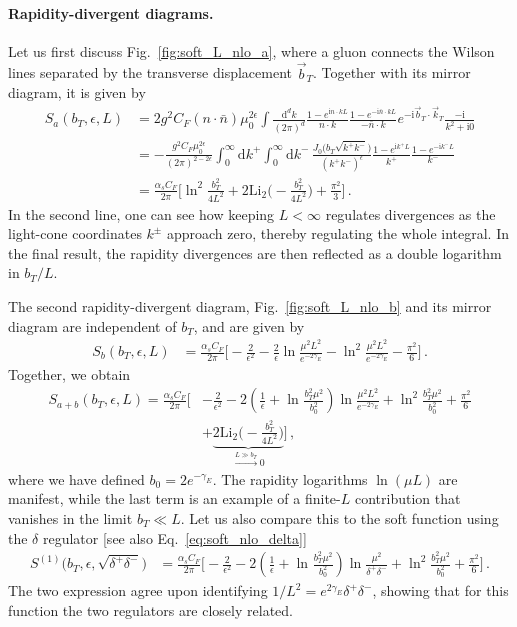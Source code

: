 \documentclass[11pt,a4paper]{article}
\DeclareRobustCommand{\eq}[1]{Eq.~\eqref{eq:#1}}
\DeclareRobustCommand{\fig}[1]{Fig.~\ref{fig:#1}}
\DeclareRobustCommand{\Li}[1]{\mathrm{Li}_{#1}}
\newcommand{\df}{\mathrm{d}}
\newcommand{\img}{\mathrm{i}}
\newcommand{\eps}{\epsilon}
\newcommand{\nn}{\nonumber}
\newcommand{\bn}{{\bar{n}}}
\newcommand{\as}{\alpha_s}
\newcommand{\Lb}[1]{\ln^{#1}\frac{b_T^2 \mu^2}{b_0^2}}
\newcommand{\bt}{\vec b_T}
\newcommand{\kt}{\vec k_T}
\begin{document}
\paragraph{Rapidity-divergent diagrams.}
Let us first discuss \fig{soft_L_nlo_a}, where a gluon connects the Wilson lines separated by the transverse displacement $\bt$.
Together with its mirror diagram, it is given by
\begin{align} \label{eq:soft_L_a}
 S_a(b_T,\eps,L) &
 =  2 g^2 C_F (n\cdot\bn) \mu_0^{2\eps} \int\frac{\df^d k}{(2\pi)^d}
   \frac{1 - e^{\img n \cdot k L}}{n \cdot k} \frac{1 - e^{- \img \bn \cdot k L}}{-\bn \cdot k} e^{-\img \bt \cdot \kt}
   \frac{-\img}{k^2+\img0}
\nn\\&
 = - \frac{g^2 C_F  \mu_0^{2\eps}}{(2\pi)^{2-2\eps}}
   \int_0^\infty \df k^+ \int_0^\infty \df k^- \, \frac{J_0\bigl(b_T \sqrt{k^+ k^-}\bigr)}{(k^+ k^-)^{\eps}}
   \frac{1 - e^{\img k^+ L}}{k^+} \frac{1 - e^{- \img k^- L}}{k^-}
\nn\\&
 = \frac{\as C_F}{2\pi} \biggl[ \ln^2\frac{b_T^2}{4 L^2}
   + 2 \Li{2}\biggl(\!-\frac{b_T^2}{4 L^2}\biggr) + \frac{\pi^2}{3} \biggr]
\,.\end{align}
In the second line, one can see how keeping $L<\infty$ regulates divergences
as the light-cone coordinates $k^\pm$ approach zero, thereby regulating the whole integral.
In the final result, the rapidity divergences are then reflected as a double logarithm in $b_T/L$.

The second rapidity-divergent diagram, \fig{soft_L_nlo_b} and its mirror diagram are independent of $b_T$, and are given by
\begin{align} \label{eq:soft_L_b}
 S_b(b_T,\eps,L) &
 = \frac{\as C_F}{2\pi} \biggl[ -\frac{2}{\eps^2} - \frac{2}{\eps} \ln\frac{\mu^2 L^2}{e^{-2\gamma_E}}
      - \ln^2\frac{\mu^2 L^2}{e^{-2\gamma_E}} - \frac{\pi^2}{6} \biggr]
\,.\end{align}
Together, we obtain
\begin{align}
 S_{a+b}(b_T,\eps,L)
 = \frac{\as C_F}{2\pi} \biggl[& - \frac{2}{\eps^2}
   - 2 \left(\frac{1}{\eps} + \Lb{}\right) \ln\frac{\mu^2 L^2}{e^{-2\gamma_E}}
   + \Lb{2} + \frac{\pi^2}{6}
   \nn\\&
   + \underbrace{2 \Li{2}\biggl(\!-\frac{b_T^2}{4 L^2}\biggr)}_{\stackrel{L\gg b_T}{\longrightarrow} 0}
   \biggr]
\,,\end{align}
where we have defined $b_0=2 e^{-\gamma_E}$.
The rapidity logarithms $\ln(\mu L)$ are manifest, while the last term is an example of a finite-$L$ contribution
that vanishes in the limit $b_T \ll L$.
Let us also compare this to the soft function using the $\delta$ regulator \cite{Echevarria:2012js} [see also \eq{soft_nlo_delta}]
\begin{align}
 S^{(1)}\bigl(b_T,\eps, \sqrt{\delta^+ \delta^-}\bigr) &= \frac{\as C_F}{2\pi} \biggl[
  - \frac{2}{\eps^2} - 2 \left(\frac{1}{\eps} + \Lb{}\right) \ln\frac{\mu^2}{\delta^+\delta^-}
  + \Lb{2} + \frac{\pi^2}{6}  \biggr]
\,.\end{align}
The two expression agree upon identifying $1/L^2 = e^{2\gamma_E} \delta^+ \delta^-$,
showing that for this function the two regulators are closely related.
\end{document}
